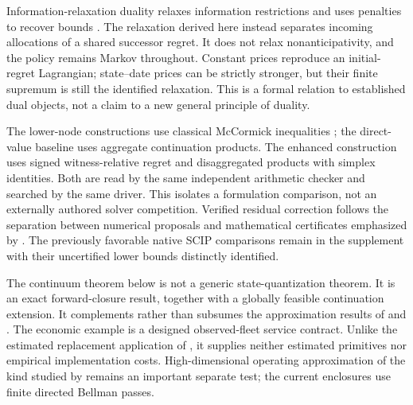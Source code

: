 Information-relaxation duality relaxes information restrictions and uses penalties to recover bounds \citep{BrownSmithSun2010,BrownSmith2014}. The relaxation derived here instead separates incoming allocations of a shared successor regret. It does not relax nonanticipativity, and the policy remains Markov throughout. Constant prices reproduce an initial-regret Lagrangian; state--date prices can be strictly stronger, but their finite supremum is still the identified relaxation. This is a formal relation to established dual objects, not a claim to a new general principle of duality.

The lower-node constructions use classical McCormick inequalities \citep{McCormick1976}; the direct-value baseline uses aggregate continuation products. The enhanced construction uses signed witness-relative regret and disaggregated products with simplex identities. Both are read by the same independent arithmetic checker and searched by the same driver. This isolates a formulation comparison, not an externally authored solver competition. Verified residual correction follows the separation between numerical proposals and mathematical certificates emphasized by \citet{Rump2010}. The previously favorable native SCIP comparisons remain in the supplement with their uncertified lower bounds distinctly identified.

The continuum theorem below is not a generic state-quantization theorem. It is an exact forward-closure result, together with a globally feasible continuation extension. It complements rather than subsumes the approximation results of \citet{DufourPrietoRumeau2013} and \citet{Saldi2018}. The economic example is a designed observed-fleet service contract. Unlike the estimated replacement application of \citet{Rust1987}, it supplies neither estimated primitives nor empirical implementation costs. High-dimensional operating approximation of the kind studied by \citet{BrummScheidegger2017} remains an important separate test; the current enclosures use finite directed Bellman passes.

